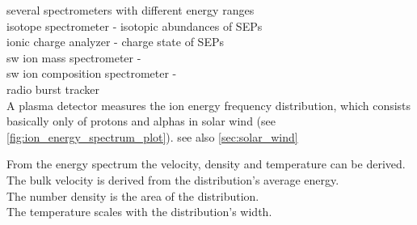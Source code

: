 several spectrometers with different energy ranges\\

isotope spectrometer - isotopic abundances of SEPs\\
ionic charge analyzer - charge state of SEPs\\
sw ion mass spectrometer - \\
sw ion composition spectrometer - \\
radio burst tracker\\


A plasma detector measures the ion energy frequency distribution, which consists basically only of protons and alphas in solar wind (see \autoref{fig:ion_energy_spectrum_plot}). see also \autoref{sec:solar_wind}
\\
\begin{figure}[htb]
\end{figure}

From the energy spectrum the velocity, density and temperature can be derived.\\

The bulk velocity is derived from the distribution's average energy.\\
The number density is the area of the distribution.\\
The temperature scales with the distribution's width.\\


